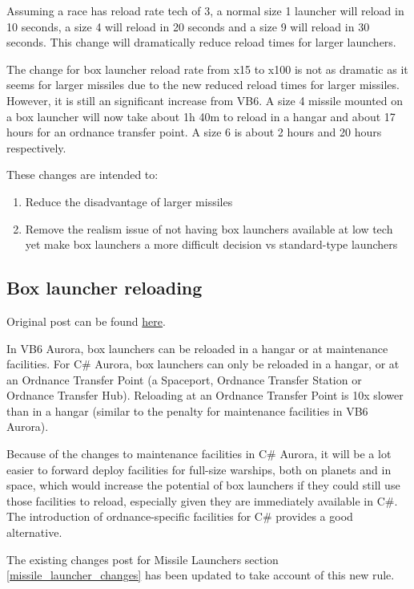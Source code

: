 \documentclass[../Aurora C# unofficial manual.tex]{subfiles}
\begin{document}
	Assuming a race has reload rate tech of 3, a normal size 1 launcher will reload in 10 seconds, a size 4 will reload in 20 seconds and a size 9 will reload in 30 seconds. This change will dramatically reduce reload times for larger launchers.
	
	The change for box launcher reload rate from x15 to x100 is not as dramatic as it seems for larger missiles due to the new reduced reload times for larger missiles. However, it is still an significant increase from VB6. A size 4 missile mounted on a box launcher will now take about 1h 40m to reload in a hangar and about 17 hours for an ordnance transfer point. A size 6 is about 2 hours and 20 hours respectively.
	
	These changes are intended to:
	\begin{enumerate}
		\item Reduce the disadvantage of larger missiles
		\item Remove the realism issue of not having box launchers available at low tech yet make box launchers a more difficult decision vs standard-type launchers
	\end{enumerate}
	
	
	\subsection{Box launcher reloading}
	Original post can be found
	\href{http://aurora2.pentarch.org/index.php?topic=8495.msg109127#msg109127}{here}.
	\newline\newline
	
	In VB6 Aurora, box launchers can be reloaded in a hangar or at maintenance facilities. For C\# Aurora, box launchers can only be reloaded in a hangar, or at an Ordnance Transfer Point (a Spaceport, Ordnance Transfer Station or Ordnance Transfer Hub). Reloading at an Ordnance Transfer Point is 10x slower than in a hangar (similar to the penalty for maintenance facilities in VB6 Aurora).
	
	Because of the changes to maintenance facilities in C\# Aurora, it will be a lot easier to forward deploy facilities for full-size warships, both on planets and in space, which would increase the potential of box launchers if they could still use those facilities to reload, especially given they are immediately available in C\#. The introduction of ordnance-specific facilities for C\# provides a good alternative.
	
	The existing changes post for Missile Launchers section \ref{missile_launcher_changes} has been updated to take account of this new rule.
	
\end{document}
